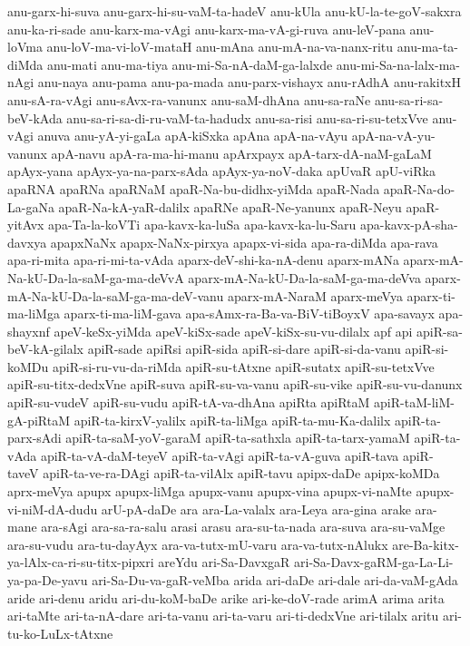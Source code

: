 {anu-garx-hi-suva
anu-garx-hi-su-vaM-ta-hadeV
anu-kUla
anu-kU-la-te-goV-sakxra
anu-ka-ri-sade
anu-karx-ma-vAgi
anu-karx-ma-vA-gi-ruva
anu-leV-pana
anu-loVma
anu-loV-ma-vi-loV-mataH
anu-mAna
anu-mA-na-va-nanx-ritu
anu-ma-ta-diMda
anu-mati
anu-ma-tiya
anu-mi-Sa-nA-daM-ga-lalxde
anu-mi-Sa-na-lalx-ma-nAgi
anu-naya
anu-pama
anu-pa-mada
anu-parx-vishayx
anu-rAdhA
anu-rakitxH
anu-sA-ra-vAgi
anu-sAvx-ra-vanunx
anu-saM-dhAna
anu-sa-raNe
anu-sa-ri-sa-beV-kAda
anu-sa-ri-sa-di-ru-vaM-ta-hadudx
anu-sa-risi
anu-sa-ri-su-tetxVve
anu-vAgi
anuva
anu-yA-yi-gaLa
apA-kiSxka
apAna
apA-na-vAyu
apA-na-vA-yu-vanunx
apA-navu
apA-ra-ma-hi-manu
apArxpayx
apA-tarx-dA-naM-gaLaM
apAyx-yana
apAyx-ya-na-parx-sAda
apAyx-ya-noV-daka
apUvaR
apU-viRka
apaRNA
apaRNa
apaRNaM
apaR-Na-bu-didhx-yiMda
apaR-Nada
apaR-Na-do-La-gaNa
apaR-Na-kA-yaR-dalilx
apaRNe
apaR-Ne-yanunx
apaR-Neyu
apaR-yitAvx
apa-Ta-la-koVTi
apa-kavx-ka-luSa
apa-kavx-ka-lu-Saru
apa-kavx-pA-sha-davxya
apapxNaNx
apapx-NaNx-pirxya
apapx-vi-sida
apa-ra-diMda
apa-rava
apa-ri-mita
apa-ri-mi-ta-vAda
aparx-deV-shi-ka-nA-denu
aparx-mANa
aparx-mA-Na-kU-Da-la-saM-ga-ma-deVvA
aparx-mA-Na-kU-Da-la-saM-ga-ma-deVva
aparx-mA-Na-kU-Da-la-saM-ga-ma-deV-vanu
aparx-mA-NaraM
aparx-meVya
aparx-ti-ma-liMga
aparx-ti-ma-liM-gava
apa-sAmx-ra-Ba-va-BiV-tiBoyxV
apa-savayx
apa-shayxnf
apeV-keSx-yiMda
apeV-kiSx-sade
apeV-kiSx-su-vu-dilalx
apf
api
apiR-sa-beV-kA-gilalx
apiR-sade
apiRsi
apiR-sida
apiR-si-dare
apiR-si-da-vanu
apiR-si-koMDu
apiR-si-ru-vu-da-riMda
apiR-su-tAtxne
apiR-sutatx
apiR-su-tetxVve
apiR-su-titx-dedxVne
apiR-suva
apiR-su-va-vanu
apiR-su-vike
apiR-su-vu-danunx
apiR-su-vudeV
apiR-su-vudu
apiR-tA-va-dhAna
apiRta
apiRtaM
apiR-taM-liM-gA-piRtaM
apiR-ta-kirxV-yalilx
apiR-ta-liMga
apiR-ta-mu-Ka-dalilx
apiR-ta-parx-sAdi
apiR-ta-saM-yoV-garaM
apiR-ta-sathxla
apiR-ta-tarx-yamaM
apiR-ta-vAda
apiR-ta-vA-daM-teyeV
apiR-ta-vAgi
apiR-ta-vA-guva
apiR-tava
apiR-taveV
apiR-ta-ve-ra-DAgi
apiR-ta-vilAlx
apiR-tavu
apipx-daDe
apipx-koMDa
aprx-meVya
apupx
apupx-liMga
apupx-vanu
apupx-vina
apupx-vi-naMte
apupx-vi-niM-dA-dudu
arU-pA-daDe
ara
ara-La-valalx
ara-Leya
ara-gina
arake
ara-mane
ara-sAgi
ara-sa-ra-salu
arasi
arasu
ara-su-ta-nada
ara-suva
ara-su-vaMge
ara-su-vudu
ara-tu-dayAyx
ara-va-tutx-mU-varu
ara-va-tutx-nAlukx
are-Ba-kitx-ya-lAlx-ca-ri-su-titx-pipxri
areYdu
ari-Sa-DavxgaR
ari-Sa-Davx-gaRM-ga-La-Li-ya-pa-De-yavu
ari-Sa-Du-va-gaR-veMba
arida
ari-daDe
ari-dale
ari-da-vaM-gAda
aride
ari-denu
aridu
ari-du-koM-baDe
arike
ari-ke-doV-rade
arimA
arima
arita
ari-taMte
ari-ta-nA-dare
ari-ta-vanu
ari-ta-varu
ari-ti-dedxVne
ari-tilalx
aritu
ari-tu-ko-LuLx-tAtxne
}
